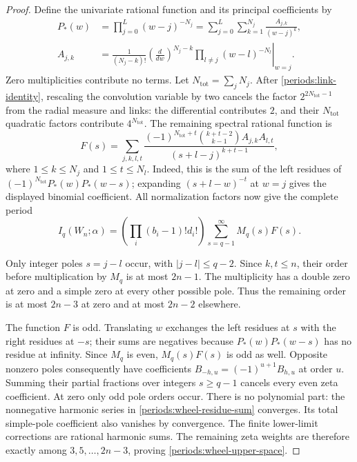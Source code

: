 \begin{proof}
Define the univariate rational function and its principal coefficients by
\begin{align}
 P_*(w)&=\prod_{j=0}^{L}(w-j)^{-N_j}
       =\sum_{j=0}^{L}\sum_{k=1}^{N_j}\frac{A_{j,k}}{(w-j)^k},
 \label{periods:univariate-function}\\
 A_{j,k}&=\left.
 \frac{1}{(N_j-k)!}\left(\frac{d}{dw}\right)^{N_j-k}
 \prod_{l\ne j}(w-l)^{-N_l}\right|_{w=j}.
 \label{periods:principal-coefficients}
\end{align}
Zero multiplicities contribute no terms.  Let $N_{\mathrm{tot}}=\sum_jN_j$.
After \eqref{periods:link-identity}, rescaling the convolution variable
by two cancels the factor $2^{2N_{\mathrm{tot}}-1}$ from the radial
measure and links: the differential contributes $2$, and their
$N_{\mathrm{tot}}$ quadratic factors contribute $4^{N_{\mathrm{tot}}}$.
The remaining spectral rational function is
\begin{equation}
 F(s)=\sum_{j,k,l,t}
 \frac{(-1)^{N_{\mathrm{tot}}+t}
 \binom{k+t-2}{k-1}A_{j,k}A_{l,t}}
 {(s+l-j)^{k+t-1}},
 \label{periods:convolution-residues}
\end{equation}
where $1\le k\le N_j$ and $1\le t\le N_l$.  Indeed, this is the sum
of the left residues of $(-1)^{N_{\mathrm{tot}}}P_*(w)P_*(w-s)$;
expanding $(s+l-w)^{-t}$ at $w=j$ gives the displayed binomial coefficient.
All normalization factors now give the complete period
\begin{equation}
 I_q(W_n;\alpha)=
 \left(\prod_i(b_i-1)!d_i!\right)
 \sum_{s=q-1}^{\infty}M_q(s)F(s).
 \label{periods:wheel-residue-sum}
\end{equation}

Only integer poles $s=j-l$ occur, with $|j-l|\le q-2$.
Since $k,t\le n$, their order before multiplication by $M_q$ is at
most $2n-1$.  The multiplicity has a double zero at zero and a simple
zero at every other possible pole.  Thus the remaining order is at
most $2n-3$ at zero and at most $2n-2$ elsewhere.

The function $F$ is odd.  Translating $w$ exchanges the left residues
at $s$ with the right residues at $-s$; their sums are negatives because
$P_*(w)P_*(w-s)$ has no residue at infinity.  Since $M_q$ is even,
$M_q(s)F(s)$ is odd as well.  Opposite nonzero poles consequently have
coefficients $B_{-h,u}=(-1)^{u+1}B_{h,u}$ at order $u$.  Summing their
partial fractions over integers $s\ge q-1$ cancels every even zeta
coefficient.  At zero only odd pole orders occur.  There is no polynomial
part: the nonnegative harmonic series in
\eqref{periods:wheel-residue-sum} converges.  Its total simple-pole
coefficient also vanishes by convergence.  The finite lower-limit
corrections are rational harmonic sums.  The remaining zeta weights
are therefore exactly among $3,5,\ldots,2n-3$, proving
\eqref{periods:wheel-upper-space}.
\end{proof}

